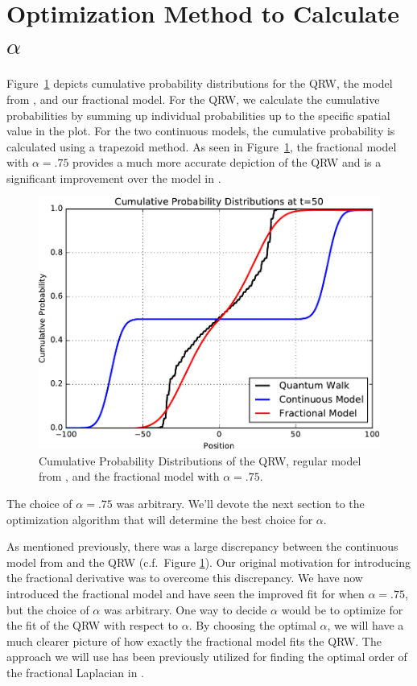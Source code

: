 \documentclass{siamart1116}
\begin{document}
\section{Optimization Method to Calculate $\alpha$} \label{s:Optimization}
Figure~\ref{cumulativeplot} depicts cumulative probability distributions for the QRW, the model from \cite{blanchard}, and our fractional model. For the QRW, we calculate the cumulative probabilities by summing up individual probabilities up to the specific spatial value in the plot. For the two continuous models, the cumulative probability is calculated using a trapezoid method. As seen in Figure~\ref{cumulativeplot}, the fractional model with $\alpha=.75$ provides a much more accurate depiction of the QRW and is a significant improvement over the model in \cite{blanchard}.
\begin{figure}[h!]
\centering
\includegraphics[width=.5\linewidth]{goldwateressay_fig1}
\caption{\footnotesize{Cumulative Probability Distributions of the QRW, regular model from \cite{blanchard}, and the fractional model with $\alpha=.75$.}}
\label{cumulativeplot}
\end{figure}
The choice of $\alpha=.75$ was arbitrary. We'll devote the next section to the optimization algorithm that will determine the best choice for $\alpha$.


As mentioned previously, there was a large discrepancy between the continuous model from  \cite{blanchard} and the QRW (c.f.\ Figure \ref{cumulativeplot}). Our original motivation for introducing the fractional derivative was to overcome this discrepancy. We have now introduced the fractional model and have seen the improved fit for when $\alpha=.75$, but the choice of $\alpha$ was arbitrary. One way to decide $\alpha$ would be to optimize for the fit of the QRW with respect to $\alpha$. By choosing the optimal $\alpha$, we will have a much clearer picture of how exactly the fractional model fits the QRW. The approach we will use has been previously utilized for finding the optimal order of the fractional Laplacian in \cite{valdinoci_opt}.
\end{document}
